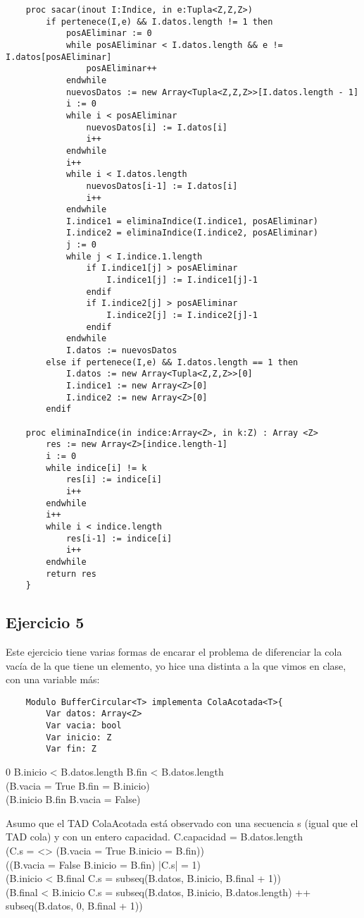 \documentclass[10pt,a4paper]{article}
\begin{document}
\begin{lstlisting}
	proc sacar(inout I:Indice, in e:Tupla<Z,Z,Z>)
		if pertenece(I,e) && I.datos.length != 1 then
			posAEliminar := 0 
			while posAEliminar < I.datos.length && e != I.datos[posAEliminar]
				posAEliminar++
			endwhile
			nuevosDatos := new Array<Tupla<Z,Z,Z>>[I.datos.length - 1]
			i := 0 
			while i < posAEliminar
				nuevosDatos[i] := I.datos[i]
				i++
			endwhile
			i++
			while i < I.datos.length
				nuevosDatos[i-1] := I.datos[i]
				i++
			endwhile
			I.indice1 = eliminaIndice(I.indice1, posAEliminar)
			I.indice2 = eliminaIndice(I.indice2, posAEliminar)
			j := 0 
			while j < I.indice.1.length
				if I.indice1[j] > posAEliminar
					I.indice1[j] := I.indice1[j]-1
				endif
				if I.indice2[j] > posAEliminar
					I.indice2[j] := I.indice2[j]-1
				endif
			endwhile
			I.datos := nuevosDatos
		else if pertenece(I,e) && I.datos.length == 1 then
			I.datos := new Array<Tupla<Z,Z,Z>>[0]
			I.indice1 := new Array<Z>[0]
			I.indice2 := new Array<Z>[0]
		endif

	proc eliminaIndice(in indice:Array<Z>, in k:Z) : Array <Z>
		res := new Array<Z>[indice.length-1]
		i := 0
		while indice[i] != k
			res[i] := indice[i]
			i++
		endwhile
		i++
		while i < indice.length
			res[i-1] := indice[i]
			i++
		endwhile
		return res
	}

\end{lstlisting}

\subsection{Ejercicio 5}
Este ejercicio tiene varias formas de encarar el problema de diferenciar la cola vacía de la que tiene un elemento, yo hice una distinta
a la que vimos en clase, con una variable más:

\begin{lstlisting}
	Modulo BufferCircular<T> implementa ColaAcotada<T>{
		Var datos: Array<Z>
		Var vacia: bool
		Var inicio: Z
		Var fin: Z
\end{lstlisting}

{0 \le B.inicio < B.datos.length  \le B.fin < B.datos.length \land \\
(B.vacia = True \implica B.fin = B.inicio) \land \\
(B.inicio \neq B.fin \implica B.vacia = False)}

Asumo que el TAD ColaAcotada está observado con una secuencia s (igual que el TAD cola) y con un entero capacidad.
{C.capacidad = B.datos.length \land \\ (C.s = <> \iff (B.vacia = True \land B.inicio = B.fin)) \land \\
((B.vacia = False \land B.inicio = B.fin) \implica |C.s| = 1) \land \\
(B.inicio < B.final \implicaLuego C.s = subseq(B.datos, B.inicio, B.final + 1)) \land \\
(B.final < B.inicio \implicaLuego C.s = subseq(B.datos, B.inicio, B.datos.length) ++ subseq(B.datos, 0, B.final + 1))}
\end{document}
